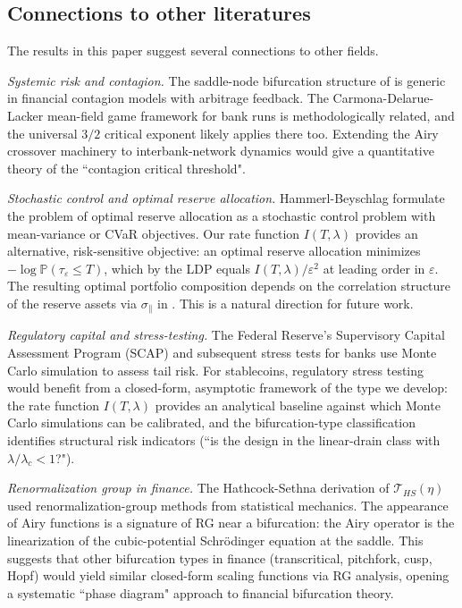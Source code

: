 \documentclass[11pt,a4paper]{article}
\theoremstyle{plain}
\theoremstyle{definition}
\renewcommand{\P}{\mathbb{P}}
\newcommand{\eps}{\varepsilon}
\begin{document}
\subsection{Connections to other literatures}

The results in this paper suggest several connections to other fields.

\emph{Systemic risk and contagion.} The saddle-node bifurcation structure of  is generic in financial contagion models with arbitrage feedback. The Carmona-Delarue-Lacker \cite{CarmonaDelarueLacker2017} mean-field game framework for bank runs is methodologically related, and the universal $3/2$ critical exponent likely applies there too. Extending the Airy crossover machinery to interbank-network dynamics would give a quantitative theory of the ``contagion critical threshold".

\emph{Stochastic control and optimal reserve allocation.} Hammerl-Beyschlag \cite{HammerlBeyschlag2025} formulate the problem of optimal reserve allocation as a stochastic control problem with mean-variance or CVaR objectives. Our rate function $I(T,\lambda)$ provides an alternative, risk-sensitive objective: an optimal reserve allocation minimizes $-\log\P(\tau_\eps \leq T)$, which by the LDP equals $I(T,\lambda)/\eps^2$ at leading order in $\eps$. The resulting optimal portfolio composition depends on the correlation structure of the reserve assets via $\sigma_\|$ in . This is a natural direction for future work.

\emph{Regulatory capital and stress-testing.} The Federal Reserve's Supervisory Capital Assessment Program (SCAP) and subsequent stress tests for banks use Monte Carlo simulation to assess tail risk. For stablecoins, regulatory stress testing would benefit from a closed-form, asymptotic framework of the type we develop: the rate function $I(T,\lambda)$ provides an analytical baseline against which Monte Carlo simulations can be calibrated, and the bifurcation-type classification identifies structural risk indicators (``is the design in the linear-drain class with $\lambda/\lambda_c < 1$?").

\emph{Renormalization group in finance.} The Hathcock-Sethna derivation of $\mathcal T_{HS}(\eta)$ used renormalization-group methods from statistical mechanics. The appearance of Airy functions is a signature of RG near a bifurcation: the Airy operator is the linearization of the cubic-potential Schr\"odinger equation at the saddle. This suggests that other bifurcation types in finance (transcritical, pitchfork, cusp, Hopf) would yield similar closed-form scaling functions via RG analysis, opening a systematic ``phase diagram" approach to financial bifurcation theory.
\end{document}

